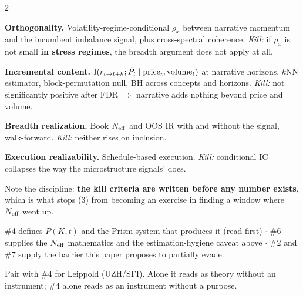 \documentclass[10pt,a4paper]{article}
\begin{document}
\begin{multicols}{2}
\begin{opnums}
\item \textbf{Orthogonality.} Volatility-regime-conditional $\rho_x$ between narrative momentum and the
      incumbent imbalance signal, plus cross-spectral coherence. \emph{Kill:} if $\rho_x$ is not small
      \textbf{in stress regimes}, the breadth argument does not apply at all.
\item \textbf{Incremental content.} $\operatorname{I}(r_{t\to t+h};\dot P_t \mid \text{price}_t,\text{volume}_t)$ at
      narrative horizons, $k$NN estimator, block-permutation null, BH across concepts and horizons.
      \emph{Kill:} not significantly positive after FDR $\Rightarrow$ narrative adds nothing beyond price
      and volume.
\item \textbf{Breadth realization.} Book $N_{\mathrm{eff}}$ and OOS IR with and without the signal, walk-forward.
      \emph{Kill:} neither rises on inclusion.
\item \textbf{Execution realizability.} Schedule-based execution. \emph{Kill:} conditional IC collapses
      the way the microstructure signals' does.
\end{opnums}
Note the discipline: \textbf{the kill criteria are written before any number exists}, which is what
stops (3) from becoming an exercise in finding a window where $N_{\mathrm{eff}}$ went up.

\#4 defines $P(K,t)$ and the Prism system that produces it (read first) $\cdot$ \#6 supplies the $N_{\mathrm{eff}}$
mathematics and the estimation-hygiene caveat above $\cdot$ \#2 and \#7 supply the barrier this paper
proposes to partially evade.

Pair with \#4 for Leippold (UZH/SFI). Alone it reads as theory without an instrument; \#4 alone reads as
an instrument without a purpose.

\end{multicols}

\end{document}

